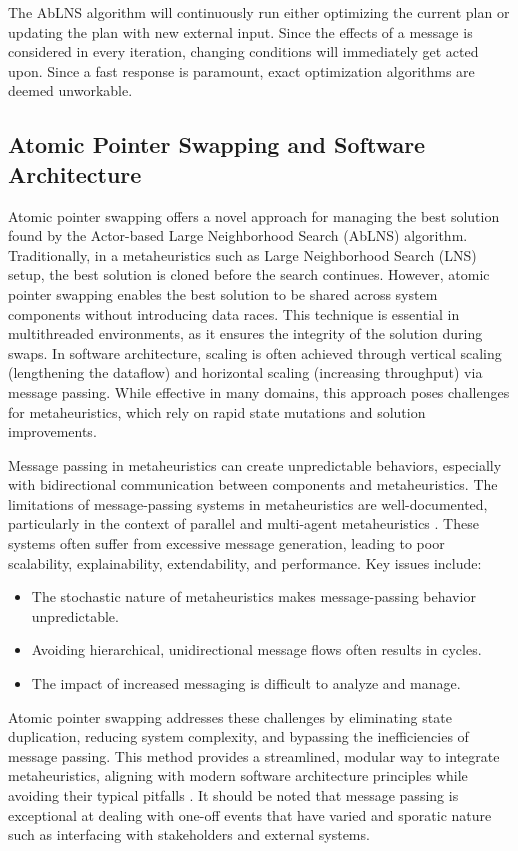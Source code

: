 The AbLNS algorithm will continuously run either optimizing the current plan or updating the plan 
with new external input. Since the effects of a message is considered in every iteration, changing 
conditions will immediately get acted upon. Since a fast response is paramount, exact optimization algorithms are deemed unworkable.

\subsection{Atomic Pointer Swapping and Software Architecture}
Atomic pointer swapping offers a novel approach for managing the best
solution found by the Actor-based Large Neighborhood Search (AbLNS) algorithm.
Traditionally, in a metaheuristics such as Large Neighborhood Search (LNS) setup, 
the best solution
is cloned before the search continues. However, atomic pointer swapping enables
the best solution to be shared across system components without introducing data
races. This technique is essential in multithreaded environments, as it ensures
the integrity of the solution during swaps. In software architecture, scaling
is often achieved through vertical scaling (lengthening the dataflow) and
horizontal scaling (increasing throughput) via message passing. While effective
in many domains, this approach poses challenges for metaheuristics, which
rely on rapid state mutations and solution improvements. 

Message passing in metaheuristics can create unpredictable behaviors,
especially with bidirectional communication between components and metaheuristics. The
limitations of message-passing systems in metaheuristics are well-documented,
particularly in the context of parallel and multi-agent metaheuristics
\citep{talbiMetaheuristicsDesignImplementation2009}. These systems often
suffer from excessive message generation, leading to poor scalability,
explainability, extendability, and performance. Key issues include: 

\begin{itemize} 
	\item The stochastic nature
		of metaheuristics makes message-passing behavior unpredictable. 
	\item Avoiding
		hierarchical, unidirectional message flows often results in cycles. 
	\item The
		impact of increased messaging is difficult to analyze and manage. 
\end{itemize}

Atomic pointer swapping addresses these challenges by eliminating state
duplication, reducing system complexity, and bypassing the inefficiencies of
message passing. This method provides a streamlined, modular way to integrate
metaheuristics, aligning with modern software architecture principles while
avoiding their typical pitfalls \citep{richards_fundamentals_2020}. It should
be noted that message passing is exceptional at dealing with one-off events that
have varied and sporatic nature such as interfacing with stakeholders and external
systems.


